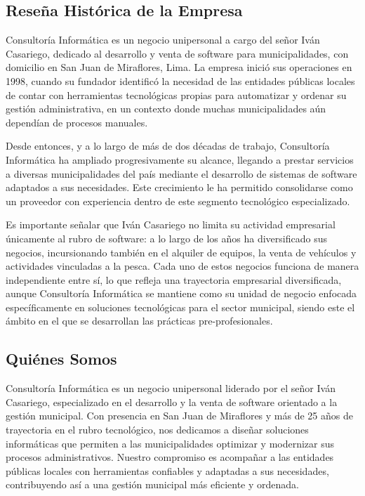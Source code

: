\documentclass[12pt,a4paper]{report}
\begin{document}
\subsection{Reseña Histórica de la Empresa}
Consultoría Informática es un negocio unipersonal a cargo del señor Iván Casariego, dedicado al desarrollo y venta de software para municipalidades, con domicilio en San Juan de Miraflores, Lima. La empresa inició sus operaciones en 1998, cuando su fundador identificó la necesidad de las entidades públicas locales de contar con herramientas tecnológicas propias para automatizar y ordenar su gestión administrativa, en un contexto donde muchas municipalidades aún dependían de procesos manuales.

Desde entonces, y a lo largo de más de dos décadas de trabajo, Consultoría Informática ha ampliado progresivamente su alcance, llegando a prestar servicios a diversas municipalidades del país mediante el desarrollo de sistemas de software adaptados a sus necesidades. Este crecimiento le ha permitido consolidarse como un proveedor con experiencia dentro de este segmento tecnológico especializado.

Es importante señalar que Iván Casariego no limita su actividad empresarial únicamente al rubro de software: a lo largo de los años ha diversificado sus negocios, incursionando también en el alquiler de equipos, la venta de vehículos y actividades vinculadas a la pesca. Cada uno de estos negocios funciona de manera independiente entre sí, lo que refleja una trayectoria empresarial diversificada, aunque Consultoría Informática se mantiene como su unidad de negocio enfocada específicamente en soluciones tecnológicas para el sector municipal, siendo este el ámbito en el que se desarrollan las prácticas pre-profesionales.

\subsection{Quiénes Somos}
Consultoría Informática es un negocio unipersonal liderado por el señor Iván Casariego, especializado en el desarrollo y la venta de software orientado a la gestión municipal. Con presencia en San Juan de Miraflores y más de 25 años de trayectoria en el rubro tecnológico, nos dedicamos a diseñar soluciones informáticas que permiten a las municipalidades optimizar y modernizar sus procesos administrativos. Nuestro compromiso es acompañar a las entidades públicas locales con herramientas confiables y adaptadas a sus necesidades, contribuyendo así a una gestión municipal más eficiente y ordenada.
\end{document}
